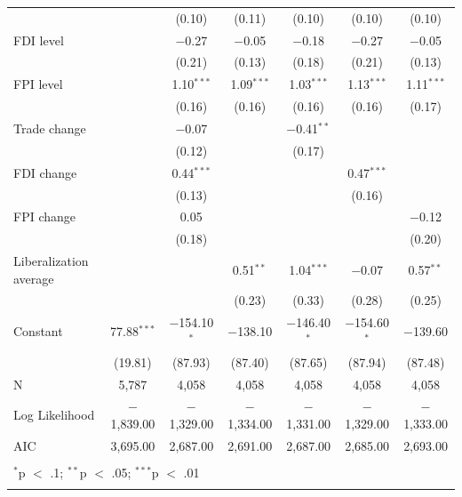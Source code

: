 \documentclass[a4paper]{article}\usepackage[]{graphicx}\usepackage[]{color}
\begin{document}
\begin{table}[!htbp]
\begin{tabular}{@{\extracolsep{5pt}}lcccccc}
  &  & (0.10) & (0.11) & (0.10) & (0.10) & (0.10) \\ 
  FDI level &  & $-$0.27 & $-$0.05 & $-$0.18 & $-$0.27 & $-$0.05 \\ 
  &  & (0.21) & (0.13) & (0.18) & (0.21) & (0.13) \\ 
  FPI level &  & 1.10$^{***}$ & 1.09$^{***}$ & 1.03$^{***}$ & 1.13$^{***}$ & 1.11$^{***}$ \\ 
  &  & (0.16) & (0.16) & (0.16) & (0.16) & (0.17) \\ 
  Trade change &  & $-$0.07 &  & $-$0.41$^{**}$ &  &  \\ 
  &  & (0.12) &  & (0.17) &  &  \\ 
  FDI change &  & 0.44$^{***}$ &  &  & 0.47$^{***}$ &  \\ 
  &  & (0.13) &  &  & (0.16) &  \\ 
  FPI change &  & 0.05 &  &  &  & $-$0.12 \\ 
  &  & (0.18) &  &  &  & (0.20) \\ 
  Liberalization average &  &  & 0.51$^{**}$ & 1.04$^{***}$ & $-$0.07 & 0.57$^{**}$ \\ 
  &  &  & (0.23) & (0.33) & (0.28) & (0.25) \\ 
  Constant & 77.88$^{***}$ & $-$154.10$^{*}$ & $-$138.10 & $-$146.40$^{*}$ & $-$154.60$^{*}$ & $-$139.60 \\ 
  & (19.81) & (87.93) & (87.40) & (87.65) & (87.94) & (87.48) \\ 
 N & 5,787 & 4,058 & 4,058 & 4,058 & 4,058 & 4,058 \\ 
Log Likelihood & $-$1,839.00 & $-$1,329.00 & $-$1,334.00 & $-$1,331.00 & $-$1,329.00 & $-$1,333.00 \\ 
AIC & 3,695.00 & 2,687.00 & 2,691.00 & 2,687.00 & 2,685.00 & 2,693.00 \\ 
\hline \\[-1.8ex] 
\multicolumn{7}{l}{$^{*}$p $<$ .1; $^{**}$p $<$ .05; $^{***}$p $<$ .01} \\ 
\normalsize 
\end{tabular} 
\end{table} 
\end{document}
